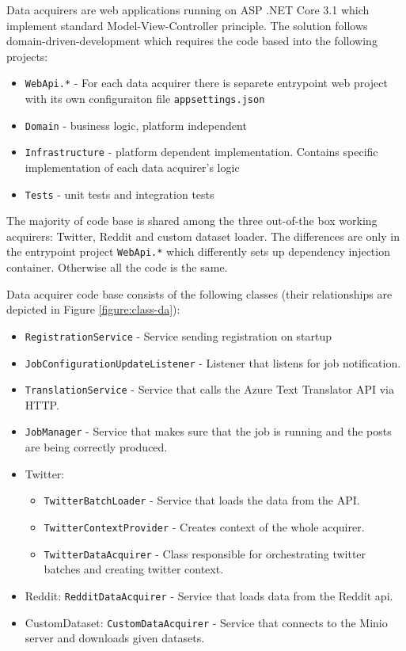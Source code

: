 Data acquirers are web applications running on ASP .NET Core 3.1 which implement standard Model-View-Controller principle. The solution follows domain-driven-development which requires the code based into the following projects: 
\begin{itemize}
    \item \texttt{WebApi.*} - For each data acquirer there is separete entrypoint web project with its own configuraiton file \texttt{appsettings.json}
    \item \texttt{Domain} - business logic, platform independent
    \item \texttt{Infrastructure} - platform dependent implementation. Contains specific implementation of each data acquirer's logic
    \item \texttt{Tests} - unit tests and integration tests
\end{itemize}

The majority of code base is shared among the three out-of-the box working acquirers: Twitter, Reddit and custom dataset loader. The differences are only in the entrypoint project \texttt{WebApi.*} which differently sets up dependency injection container. Otherwise all the code is the same.



Data acquirer code base consists of the following classes (their relationships are depicted in Figure \ref{figure:class-da}):

\begin{itemize}
    \item \texttt{RegistrationService} - Service sending registration on startup
    \item \texttt{JobConfigurationUpdateListener} - Listener that listens for job notification.
    \item \texttt{TranslationService} - Service that calls the Azure Text Translator API via HTTP.
    \item \texttt{JobManager} - Service that makes sure that the job is running and the posts are being correctly produced.
    \item Twitter: \begin{itemize}
        \item \texttt{TwitterBatchLoader} - Service that loads the data from the API.
        \item \texttt{TwitterContextProvider} - Creates context of the whole acquirer.
        \item \texttt{TwitterDataAcquirer} - Class responsible for orchestrating twitter batches and creating twitter context.
    \end{itemize}
    \item Reddit: \texttt{RedditDataAcquirer} - Service that loads data from the Reddit api.
    \item CustomDataset: \texttt{CustomDataAcquirer} - Service that connects to the Minio server and downloads given datasets.
\end{itemize}

